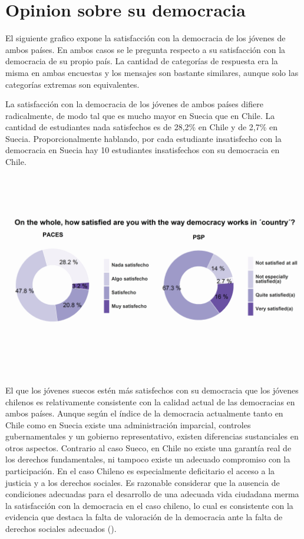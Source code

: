 \documentclass[12pt,twoside]{templates/facsothesis}
\begin{document}
\hypertarget{opinion-sobre-su-democracia-1}{%
\section{Opinion sobre su democracia}\label{opinion-sobre-su-democracia-1}}

El siguiente grafico expone la satisfacción con la democracia de los jóvenes de ambos países. En ambos casos se le pregunta respecto a su satisfacción con la democracia de su propio país. La cantidad de categorías de respuesta era la misma en ambas encuestas y los mensajes son bastante similares, aunque solo las categorías extremas son equivalentes.

La satisfacción con la democracia de los jóvenes de ambos países difiere radicalmente, de modo tal que es mucho mayor en Suecia que en Chile. La cantidad de estudiantes nada satisfechos es de 28,2\% en Chile y de 2,7\% en Suecia. Proporcionalmente hablando, por cada estudiante insatisfecho con la democracia en Suecia hay 10 estudiantes insatisfechos con su democracia en Chile.

\includegraphics{output/graph_sat.png}

El que los jóvenes suecos estén más satisfechos con su democracia que los jóvenes chilenos es relativamente consistente con la calidad actual de las democracias en ambos países. Aunque según el índice de la democracia actualmente tanto en Chile como en Suecia existe una administración imparcial, controles gubernamentales y un gobierno representativo, existen diferencias sustanciales en otros aspectos. Contrario al caso Sueco, en Chile no existe una garantía real de los derechos fundamentales, ni tampoco existe un adecuado compromiso con la participación. En el caso Chileno es especialmente deficitario el acceso a la justicia y a los derechos sociales. Es razonable considerar que la ausencia de condiciones adecuadas para el desarrollo de una adecuada vida ciudadana merma la satisfacción con la democracia en el caso chileno, lo cual es consistente con la evidencia que destaca la falta de valoración de la democracia ante la falta de derechos sociales adecuados ().
\end{document}

